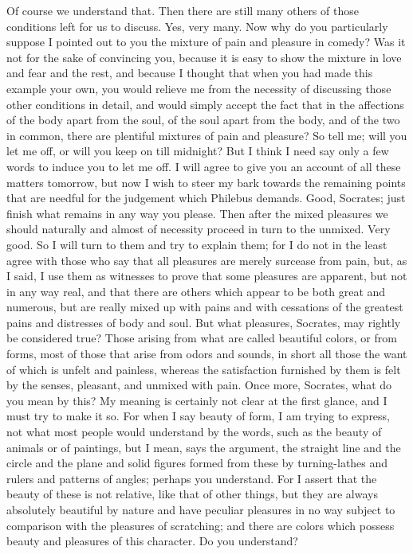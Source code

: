 \documentclass[letterpaper,12pt]{article}
\newcommand{\stephpag}[1]{\marginnote{\small\itshape\fontfamily{ppl}\selectfont #1}}
\begin{document}
\begin{drama}
\protarchusspeaks
Of course we understand that.
\socratesspeaks
Then there are still many others of those conditions left for us to discuss.
\protarchusspeaks
Yes, very many.
\socratesspeaks
Now why do you particularly suppose I pointed out to you the mixture of pain and pleasure in comedy? Was it not for the sake of convincing you, \stephpag{d} because it is easy to show the mixture in love and fear and the rest, and because I thought that when you had made this example your own, you would relieve me from the necessity of discussing those other conditions in detail, and would simply accept the fact that in the affections of the body apart from the soul, of the soul apart from the body, and of the two in common, there are plentiful mixtures of pain and pleasure? So tell me; will you let me off, or will you keep on till midnight? But I think I need say only a few words to induce you to let me off. I will agree to give you an account of all these matters \stephpag{e} tomorrow, but now I wish to steer my bark towards the remaining points that are needful for the judgement which Philebus demands.
\protarchusspeaks
Good, Socrates; just finish what remains in any way you please.
\socratesspeaks
Then after the mixed pleasures we should naturally and almost of necessity proceed in turn to the unmixed. \stephpag{51 a}
\protarchusspeaks
Very good.
\socratesspeaks
So I will turn to them and try to explain them; for I do not in the least agree with those who say that all pleasures are merely surcease from pain, but, as I said, I use them as witnesses to prove that some pleasures are apparent, but not in any way real, and that there are others which appear to be both great and numerous, but are really mixed up with pains and with cessations of the greatest pains and distresses of body and soul. \stephpag{b}
\protarchusspeaks
But what pleasures, Socrates, may rightly be considered true?
\socratesspeaks
Those arising from what are called beautiful colors, or from forms, most of those that arise from odors and sounds, in short all those the want of which is unfelt and painless, whereas the satisfaction furnished by them is felt by the senses, pleasant, and unmixed with pain.
\protarchusspeaks
Once more, Socrates, what do you mean by this?
\socratesspeaks
My meaning is certainly not clear at the first glance, \stephpag{c} and I must try to make it so. For when I say beauty of form, I am trying to express, not what most people would understand by the words, such as the beauty of animals or of paintings, but I mean, says the argument, the straight line and the circle and the plane and solid figures formed from these by turning-lathes and rulers and patterns of angles; perhaps you understand. For I assert that the beauty of these is not relative, like that of other things, but they are always absolutely beautiful by nature \stephpag{d} and have peculiar pleasures in no way subject to comparison with the pleasures of scratching; and there are colors which possess beauty and pleasures of this character. Do you understand?

\end{drama}
\end{document}
